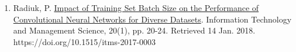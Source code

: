 \documentclass[10pt,letterpaper]{article}
\begin{document}
\begin{enumerate}
	\parskip=0.1em
	
	
	\item Radiuk, P. \href{https://doi.org/10.1515/itms-2017-0003}{Impact of Training Set Batch Size on the Performance of Convolutional Neural Networks for Diverse Datasets}. Information Technology and Management Science, 20(1), pp. 20-24. Retrieved 14 Jan. 2018. https://doi.org/10.1515/itms-2017-0003

\end{enumerate}
\end{document}
